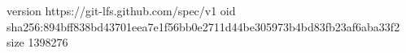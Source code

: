 version https://git-lfs.github.com/spec/v1
oid sha256:894bff838bd43701eea7e1f56bb0e2711d44be305973b4bd83fb23af6aba33f2
size 1398276
